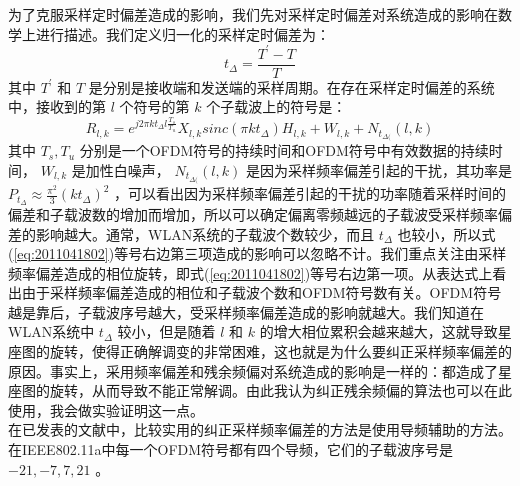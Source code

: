 \documentclass[10pt,a4paper,UTF8]{article}
\begin{document}
为了克服采样定时偏差造成的影响，我们先对采样定时偏差对系统造成的影响在数学上进行描述。我们定义归一化的采样定时偏差为：
\begin{equation}
  \label{eq:2011041801}
  t_{\Delta}=\frac{T^{'}-T}{T}
\end{equation}
其中 \(T^{'}\) 和 \(T\) 是分别是接收端和发送端的采样周期。在存在采样定时偏差的系统中，接收到的第 \(l\) 个符号的第 \(k\) 个子载波上的符号是：
\begin{equation}
  \label{eq:2011041802}
  R_{l,k} = e^{j2\pi kt_{\Delta}l\frac{T_s}{T_u}}X_{l,k}sinc(\pi kt_{\Delta}) H_{l,k} + W_{l,k} + N_{t_{\Delta(}}(l,k)
\end{equation}
其中 \(T_s,T_u\) 分别是一个OFDM符号的持续时间和OFDM符号中有效数据的持续时间， \(W_{l,k}\) 是加性白噪声， \(N_{t_{\Delta(}}(l,k)\) 是因为采样频率偏差引起的干扰，其功率是 \(P_{t_{\Delta}}\approx \frac{{\pi}^2}{3}(kt_{\Delta})^2\) ，可以看出因为采样频率偏差引起的干扰的功率随着采样时间的偏差和子载波数的增加而增加，所以可以确定偏离零频越远的子载波受采样频率偏差的影响越大。通常，WLAN系统的子载波个数较少，而且 \(t_{\Delta}\) 也较小，所以式(\ref{eq:2011041802})等号右边第三项造成的影响可以忽略不计。我们重点关注由采样频率偏差造成的相位旋转，即式(\ref{eq:2011041802})等号右边第一项。从表达式上看出由于采样频率偏差造成的相位和子载波个数和OFDM符号数有关。OFDM符号越是靠后，子载波序号越大，受采样频率偏差造成的影响就越大。我们知道在WLAN系统中  \(t_{\Delta}\)  较小，但是随着  \(l\)  和  \(k\)  的增大相位累积会越来越大，这就导致星座图的旋转，使得正确解调变的非常困难，这也就是为什么要纠正采样频率偏差的原因。事实上，采用频率偏差和残余频偏对系统造成的影响是一样的：都造成了星座图的旋转，从而导致不能正常解调。由此我认为纠正残余频偏的算法也可以在此使用，我会做实验证明这一点。\\

在已发表的文献中，比较实用的纠正采样频率偏差的方法是使用导频辅助的方法。在IEEE802.11a中每一个OFDM符号都有四个导频，它们的子载波序号是  \(-21,-7,7,21\)  。
\end{document}
